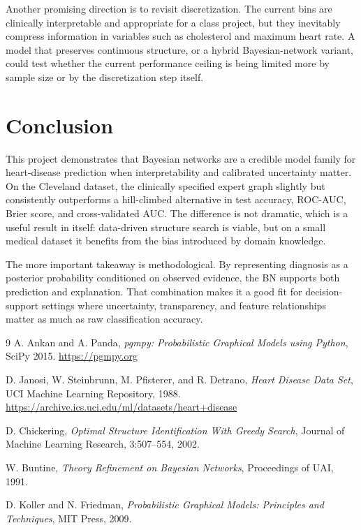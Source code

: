 \documentclass[10pt,twocolumn]{article}
\begin{document}
Another promising direction is to revisit discretization. The current bins are clinically interpretable and appropriate for a class project, but they inevitably compress information in variables such as cholesterol and maximum heart rate. A model that preserves continuous structure, or a hybrid Bayesian-network variant, could test whether the current performance ceiling is being limited more by sample size or by the discretization step itself.

\section{Conclusion}
This project demonstrates that Bayesian networks are a credible model family for heart-disease prediction when interpretability and calibrated uncertainty matter. On the Cleveland dataset, the clinically specified expert graph slightly but consistently outperforms a hill-climbed alternative in test accuracy, ROC-AUC, Brier score, and cross-validated AUC. The difference is not dramatic, which is a useful result in itself: data-driven structure search is viable, but on a small medical dataset it benefits from the bias introduced by domain knowledge.

The more important takeaway is methodological. By representing diagnosis as a posterior probability conditioned on observed evidence, the BN supports both prediction and explanation. That combination makes it a good fit for decision-support settings where uncertainty, transparency, and feature relationships matter as much as raw classification accuracy.

\begin{thebibliography}{9}
  A. Ankan and A. Panda,
  \textit{pgmpy: Probabilistic Graphical Models using Python},
  SciPy 2015. \url{https://pgmpy.org}

  D. Janosi, W. Steinbrunn, M. Pfisterer, and R. Detrano,
  \textit{Heart Disease Data Set},
  UCI Machine Learning Repository, 1988.
  \url{https://archive.ics.uci.edu/ml/datasets/heart+disease}

  D. Chickering,
  \textit{Optimal Structure Identification With Greedy Search},
  Journal of Machine Learning Research, 3:507--554, 2002.

  W. Buntine,
  \textit{Theory Refinement on Bayesian Networks},
  Proceedings of UAI, 1991.

  D. Koller and N. Friedman,
  \textit{Probabilistic Graphical Models: Principles and Techniques},
  MIT Press, 2009.
\end{thebibliography}
\end{document}
